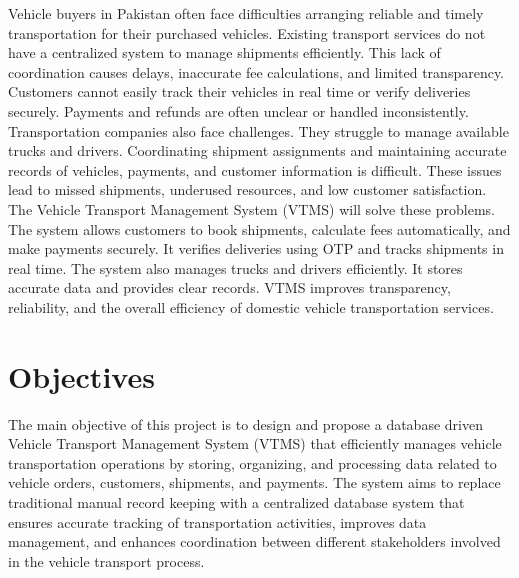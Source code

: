 \documentclass[12pt,a4paper]{article}
\begin{document}
Vehicle buyers in Pakistan often face difficulties arranging reliable and timely transportation for their purchased vehicles. Existing transport services do not have a centralized system to manage shipments efficiently. This lack of coordination causes delays, inaccurate fee calculations, and limited transparency. Customers cannot easily track their vehicles in real time or verify deliveries securely. Payments and refunds are often unclear or handled inconsistently.
Transportation companies also face challenges. They struggle to manage available trucks and drivers. Coordinating shipment assignments and maintaining accurate records of vehicles, payments, and customer information is difficult. These issues lead to missed shipments, underused resources, and low customer satisfaction.
The Vehicle Transport Management System (VTMS) will solve these problems. The system allows customers to book shipments, calculate fees automatically, and make payments securely. It verifies deliveries using OTP and tracks shipments in real time. The system also manages trucks and drivers efficiently. It stores accurate data and provides clear records. VTMS improves transparency, reliability, and the overall efficiency of domestic vehicle transportation services.




\section{Objectives}
The main objective of this project is to design and propose a database driven Vehicle Transport Management System (VTMS) that efficiently manages vehicle transportation operations by storing, organizing, and processing data related to vehicle orders, customers, shipments, and payments.
The system aims to replace traditional manual record keeping with a centralized database system that ensures accurate tracking of transportation activities, improves data management, and enhances coordination between different stakeholders involved in the vehicle transport process.
\end{document}
